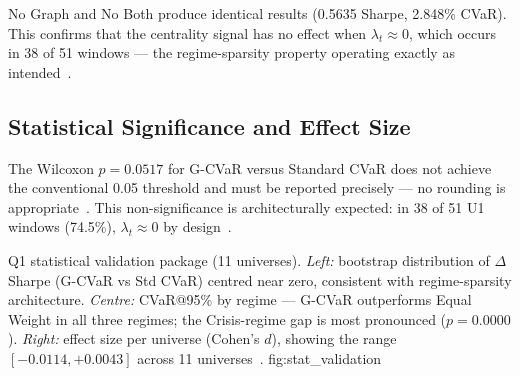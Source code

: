 No Graph and No Both produce identical results (0.5635 Sharpe, 2.848\%
CVaR). This confirms that the centrality signal has no effect when
$\lambda_t \approx 0$, which occurs in 38 of 51 windows — the
regime-sparsity property operating exactly as intended~\citep{ang2002}.

\subsection{Statistical Significance and Effect Size}

\begin{table}[H]
\centering
\caption{Pooled cross-universe statistical tests (Table~13B): 11
         universes, 139,104 paired daily observations. Wilcoxon
         signed-rank used as primary test (Shapiro-Wilk rejects
         normality for all universes~\citep{cont2001}).
         $^{**}p < 0.01$; ns: not significant at $\alpha = 0.05$.}
\label{tab:stats}
\end{table}

The Wilcoxon $p = 0.0517$ for G-CVaR versus Standard CVaR does not
achieve the conventional 0.05 threshold and must be reported precisely —
no rounding is appropriate~\citep{harvey2016}. This non-significance is
architecturally expected: in 38 of 51 U1 windows (74.5\%), $\lambda_t
\approx 0$ by design~\citep{ang2002,hamilton1989}.

  {Q1 statistical validation package (11 universes). \textit{Left:}
   bootstrap distribution of $\Delta$Sharpe (G-CVaR vs Std CVaR)
   centred near zero, consistent with regime-sparsity architecture.
   \textit{Centre:} CVaR@95\% by regime — G-CVaR outperforms Equal
   Weight in all three regimes; the Crisis-regime gap is most
   pronounced ($p = 0.0000$). \textit{Right:} effect size per
   universe (Cohen's $d$), showing the range $[-0.0114, +0.0043]$
   across 11 universes~\citep{harvey2016,cont2001}.}
  {fig:stat_validation}

